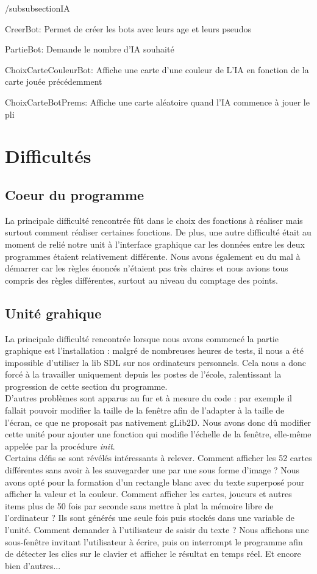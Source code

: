 \documentclass[12pt]{report}
\begin{document}
  /subsubsection{IA}
  	\item[CreerBot:] Permet de créer les bots avec leurs age et leurs pseudos
	\item[PartieBot:] Demande le nombre d'IA souhaité
	\item[ChoixCarteCouleurBot:] Affiche une carte d'une couleur de L'IA en fonction de la carte jouée précédemment
	\item[ChoixCarteBotPrems:] Affiche une carte aléatoire quand l'IA commence à jouer le pli
	
\section{Difficultés}
	\subsection{Coeur du programme}
	La principale difficulté rencontrée fût dans le choix des fonctions à réaliser mais surtout comment réaliser certaines fonctions. De plus, une autre difficulté était au moment de relié notre unit à l'interface graphique car les données entre les deux programmes étaient relativement différente. Nous avons également eu du mal à démarrer car les règles énoncés n'étaient pas très claires et nous avions tous compris des règles différentes, surtout au niveau du comptage des points.
	
	\subsection{Unité grahique}
	La principale difficulté rencontrée lorsque nous avons commencé la partie graphique est l'installation : malgré de nombreuses heures de tests, il nous a été impossible d'utiliser la lib SDL sur nos ordinateurs personnels. Cela nous a donc forcé à la travailler uniquement depuis les postes de l'école, ralentissant la progression de cette section du programme.\\ 
	
	D'autres problèmes sont apparus au fur et à mesure du code : par exemple il fallait pouvoir modifier la taille de la fenêtre afin de l'adapter à la taille de l'écran, ce que ne proposait pas nativement gLib2D. Nous avons donc dû modifier cette unité pour ajouter une fonction qui modifie l'échelle de la fenêtre, elle-même appelée par la procédure \textit{init}. \\
	\clearpage
	Certains défis se sont révélés intéressants à relever. Comment afficher les 52 cartes différentes sans avoir à les sauvegarder une par une sous forme d'image ? Nous avons opté pour la formation d'un rectangle blanc avec du texte superposé pour afficher la valeur et la couleur. Comment afficher les cartes, joueurs et autres items plus de 50 fois par seconde sans mettre à plat la mémoire libre de l'ordinateur ? Ils sont générés une seule fois puis stockés dans une variable de l'unité. Comment demander à l'utilisateur de saisir du texte ? Nous affichons une sous-fenêtre invitant l'utilisateur à écrire, puis on interrompt le programme afin de détecter les clics sur le clavier et afficher le résultat en temps réel. Et encore bien d'autres...
\end{document}
